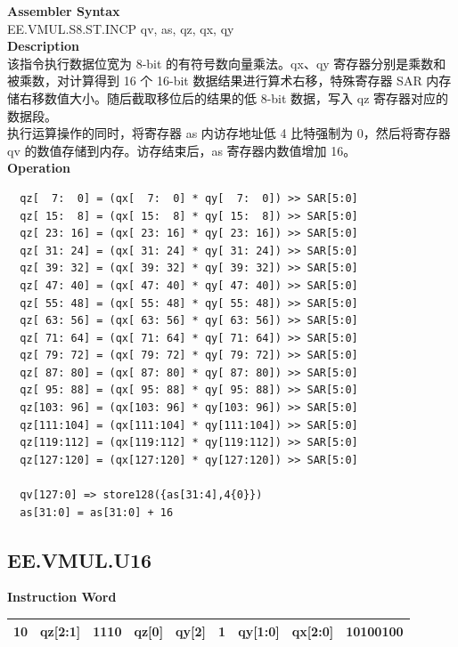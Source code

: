 \textbf{Assembler Syntax} \\
EE.VMUL.S8.ST.INCP qv, as, qz, qx, qy \\
\textbf{Description} \\
该指令执行数据位宽为 8-bit 的有符号数向量乘法。qx、qy 寄存器分别是乘数和被乘数，对计算得到 16 个 16-bit 数据结果进行算术右移，特殊寄存器 SAR 内存储右移数值大小。随后截取移位后的结果的低 8-bit 数据，写入 qz 寄存器对应的数据段。\\ 执行运算操作的同时，将寄存器 as 内访存地址低 4 比特强制为 0，然后将寄存器 qv 的数值存储到内存。访存结束后，as 寄存器内数值增加 16。\\
\textbf{Operation}
\begin{lstlisting}
  qz[  7:  0] = (qx[  7:  0] * qy[  7:  0]) >> SAR[5:0]
  qz[ 15:  8] = (qx[ 15:  8] * qy[ 15:  8]) >> SAR[5:0]
  qz[ 23: 16] = (qx[ 23: 16] * qy[ 23: 16]) >> SAR[5:0]
  qz[ 31: 24] = (qx[ 31: 24] * qy[ 31: 24]) >> SAR[5:0]
  qz[ 39: 32] = (qx[ 39: 32] * qy[ 39: 32]) >> SAR[5:0]
  qz[ 47: 40] = (qx[ 47: 40] * qy[ 47: 40]) >> SAR[5:0]
  qz[ 55: 48] = (qx[ 55: 48] * qy[ 55: 48]) >> SAR[5:0]
  qz[ 63: 56] = (qx[ 63: 56] * qy[ 63: 56]) >> SAR[5:0]
  qz[ 71: 64] = (qx[ 71: 64] * qy[ 71: 64]) >> SAR[5:0]
  qz[ 79: 72] = (qx[ 79: 72] * qy[ 79: 72]) >> SAR[5:0]
  qz[ 87: 80] = (qx[ 87: 80] * qy[ 87: 80]) >> SAR[5:0]
  qz[ 95: 88] = (qx[ 95: 88] * qy[ 95: 88]) >> SAR[5:0]
  qz[103: 96] = (qx[103: 96] * qy[103: 96]) >> SAR[5:0]
  qz[111:104] = (qx[111:104] * qy[111:104]) >> SAR[5:0]
  qz[119:112] = (qx[119:112] * qy[119:112]) >> SAR[5:0]
  qz[127:120] = (qx[127:120] * qy[127:120]) >> SAR[5:0]

  qv[127:0] => store128({as[31:4],4{0}})
  as[31:0] = as[31:0] + 16
\end{lstlisting}

\clearpage
\subsection{EE.VMUL.U16}\label{instruction:EEVMULU16}
\setlength\tabcolsep{6pt}
\textbf{Instruction Word} \\
\begin{tabular}{|c|c|c|c|c|c|c|c|c|}
	\hline
	10 & qz[2:1] & 1110 & qz[0] & qy[2] & 1 & qy[1:0] & qx[2:0] & 10100100 \\
	\hline
\end{tabular}

